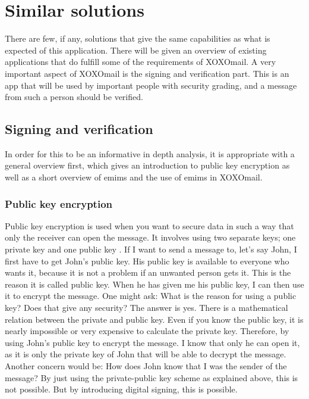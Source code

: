 

\section{Similar solutions}
There are few, if any, solutions that give the same capabilities as what is expected of this application. There will be given an overview of existing applications that do fulfill some of the requirements of XOXOmail.
\newline
\newline
A very important aspect of XOXOmail is the signing and verification part. This is an app that will be used by important people with security grading, and a message from such a person should be verified.

\subsection{Signing and verification}
In order for this to be an informative in depth analysis, it is appropriate with a general overview first, which gives an introduction to public key encryption as well as a short overview of \gls{emims} and the use of \gls{emims} in XOXOmail.

\newpage

\subsubsection{Public key encryption}
Public key encryption is used when you want to secure data in such a way that only the receiver can open the message. It involves using two separate keys; one private key and one public key \cite{bib:pke}.
\newline
\newline
If I want to send a message to, let's say John, I first have to get John's public key. His public key is available to everyone who wants it, because it is not a problem if an unwanted person gets it. This is the reason it is called public key. When he has given me his public key, I can then use it to encrypt the message. One might ask: What is the reason for using a
public key? Does that give any security? The answer is yes. There is a mathematical relation between the private and public key. Even if you know the public key, it is nearly impossible or very expensive to calculate the private key. Therefore, by using John's public key to encrypt the message. I know that only he can open it, as it is only the private key of John that will be able to decrypt the message.
\newline
\newline
Another concern would be: How does John know that I was the sender of the message? By just using the private-public key scheme as explained above, this is not possible. But by introducing digital signing, this is possible.

